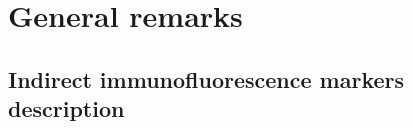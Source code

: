 \documentclass[biblatexBackend=bibtex]{tumthesis}
\begin{document}
\chapter{General remarks}
\label{Appendix-general-remarks}


\section{Indirect immunofluorescence markers description}
\label{sec:appendix:if_markers}


\backmatter


\listoffigures

\vspace*{1.5cm}

\listoftables





\printindex

\printglossary[type=\acronymtype]

\printbibliography[heading=bibintoc]

\listoffixmes
%
\end{document}
